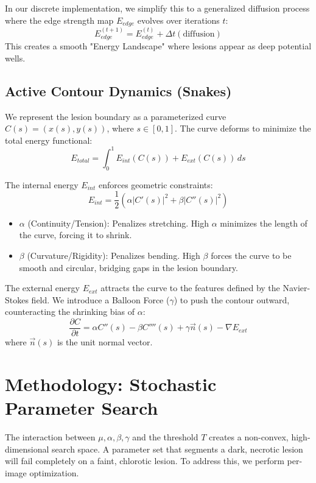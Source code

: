 \documentclass[journal]{IEEEtran}
\begin{document}
In our discrete implementation, we simplify this to a generalized diffusion process where the edge strength map $E_{edge}$ evolves over iterations $t$:
\begin{equation}
E_{edge}^{(t+1)} = E_{edge}^{(t)} + \Delta t \left( \text{diffusion} \right)
\end{equation}
This creates a smooth "Energy Landscape" where lesions appear as deep potential wells.

\subsection{Active Contour Dynamics (Snakes)}
We represent the lesion boundary as a parameterized curve $C(s) = (x(s), y(s))$, where $s \in [0, 1]$. The curve deforms to minimize the total energy functional:
\begin{equation}
E_{total} = \int_{0}^{1} E_{int}(C(s)) + E_{ext}(C(s)) \, ds
\end{equation}

The internal energy $E_{int}$ enforces geometric constraints:
\begin{equation}
E_{int} = \frac{1}{2} \left( \alpha |C'(s)|^2 + \beta |C''(s)|^2 \right)
\end{equation}
\begin{itemize}
    \item $\alpha$ (Continuity/Tension): Penalizes stretching. High $\alpha$ minimizes the length of the curve, forcing it to shrink.
    \item $\beta$ (Curvature/Rigidity): Penalizes bending. High $\beta$ forces the curve to be smooth and circular, bridging gaps in the lesion boundary.
\end{itemize}

The external energy $E_{ext}$ attracts the curve to the features defined by the Navier-Stokes field. We introduce a Balloon Force ($\gamma$) to push the contour outward, counteracting the shrinking bias of $\alpha$:
\begin{equation}
\frac{\partial C}{\partial t} = \alpha C''(s) - \beta C''''(s) + \gamma \vec{n}(s) - \nabla E_{ext}
\end{equation}
where $\vec{n}(s)$ is the unit normal vector.

\section{Methodology: Stochastic Parameter Search}

The interaction between $\mu, \alpha, \beta, \gamma$ and the threshold $T$ creates a non-convex, high-dimensional search space. A parameter set that segments a dark, necrotic lesion will fail completely on a faint, chlorotic lesion. To address this, we perform per-image optimization.
\end{document}
